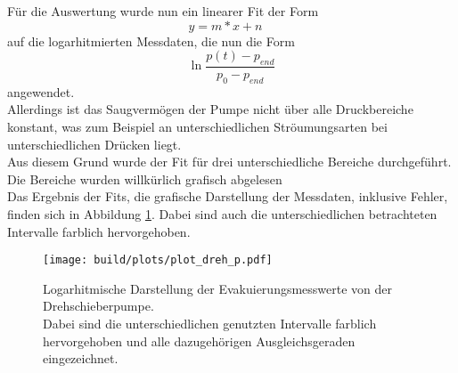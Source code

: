         \noindent Für die Auswertung wurde nun ein linearer Fit der Form
        \begin{equation*}
          y = m*x + n \quad
        \end{equation*}
        auf die logarhitmierten Messdaten, die nun die Form 
        \begin{equation*}
          \ln{\frac{p(t) - p_{end}}{p_0 - p_{end}}}
        \end{equation*}
        angewendet.\\
        Allerdings ist das Saugvermögen der Pumpe nicht über alle Druckbereiche konstant, was zum Beispiel an unterschiedlichen Ströumungsarten bei unterschiedlichen Drücken liegt.\\
        Aus diesem Grund wurde der Fit für drei unterschiedliche Bereiche durchgeführt. Die Bereiche wurden willkürlich grafisch abgelesen\\
        Das Ergebnis der Fits, die grafische Darstellung der Messdaten, inklusive Fehler, finden sich in Abbildung \ref{img:dreh_p}.
        Dabei sind auch die unterschiedlichen betrachteten Intervalle farblich hervorgehoben.\\
        \begin{figure}[h]
          \centering
          \texttt{[image: build/plots/plot\_dreh\_p.pdf]}
          \caption{Logarhitmische Darstellung der Evakuierungsmesswerte von der Drehschieberpumpe.\\
          Dabei sind die unterschiedlichen genutzten Intervalle farblich hervorgehoben und alle dazugehörigen Ausgleichsgeraden eingezeichnet.}
          \label{img:dreh_p}
        \end{figure}

